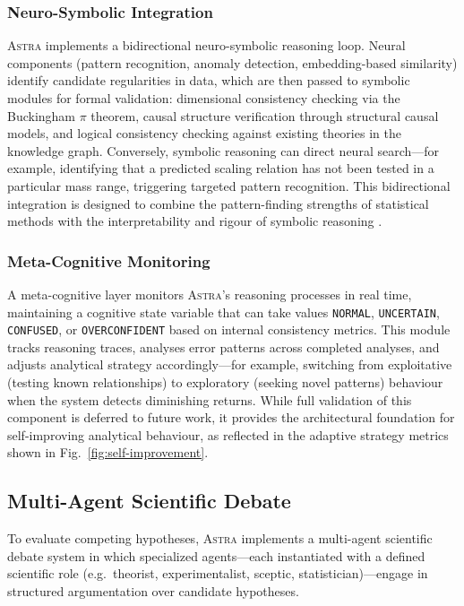 \documentclass[usenatbib]{rasti}
\newcommand{\astra}{\textsc{Astra}\xspace}
\begin{document}
\subsubsection{Neuro-Symbolic Integration}

\astra implements a bidirectional neuro-symbolic reasoning loop.
Neural components (pattern recognition, anomaly detection, embedding-based similarity) identify candidate regularities in data, which are then passed to symbolic modules for formal validation: dimensional consistency checking via the Buckingham $\pi$ theorem, causal structure verification through structural causal models, and logical consistency checking against existing theories in the knowledge graph.
Conversely, symbolic reasoning can direct neural search---for example, identifying that a predicted scaling relation has not been tested in a particular mass range, triggering targeted pattern recognition.
This bidirectional integration is designed to combine the pattern-finding strengths of statistical methods with the interpretability and rigour of symbolic reasoning \citep{Pearl2009}.

\subsubsection{Meta-Cognitive Monitoring}

A meta-cognitive layer monitors \astra's reasoning processes in real time, maintaining a cognitive state variable that can take values \texttt{NORMAL}, \texttt{UNCERTAIN}, \texttt{CONFUSED}, or \texttt{OVERCONFIDENT} based on internal consistency metrics.
This module tracks reasoning traces, analyses error patterns across completed analyses, and adjusts analytical strategy accordingly---for example, switching from exploitative (testing known relationships) to exploratory (seeking novel patterns) behaviour when the system detects diminishing returns.
While full validation of this component is deferred to future work, it provides the architectural foundation for self-improving analytical behaviour, as reflected in the adaptive strategy metrics shown in Fig.~\ref{fig:self-improvement}.

\subsection{Multi-Agent Scientific Debate}
\label{sec:methods:debate}

To evaluate competing hypotheses, \astra implements a multi-agent scientific debate system in which specialized agents---each instantiated with a defined scientific role (e.g.\ theorist, experimentalist, sceptic, statistician)---engage in structured argumentation over candidate hypotheses.
\end{document}
